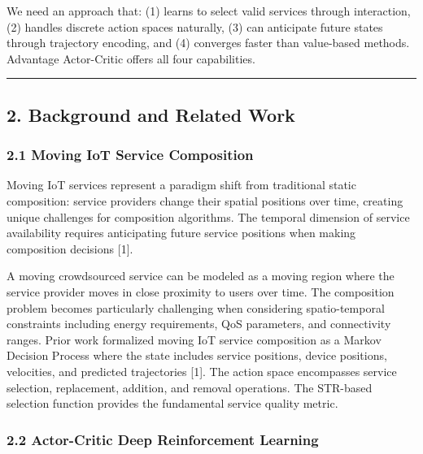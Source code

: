 \documentclass[
  10pt,
  twocolumn,
]{article}
\begin{document}
We need an approach that: (1) learns to select valid services through
interaction, (2) handles discrete action spaces naturally, (3) can
anticipate future states through trajectory encoding, and (4) converges
faster than value-based methods. Advantage Actor-Critic offers all four
capabilities.

\begin{center}\rule{0.5\linewidth}{0.5pt}\end{center}

\hypertarget{background-and-related-work}{%
	\subsection{2. Background and Related
		Work}\label{background-and-related-work}}

\hypertarget{moving-iot-service-composition}{%
	\subsubsection{2.1 Moving IoT Service
		Composition}\label{moving-iot-service-composition}}

Moving IoT services represent a paradigm shift from traditional static
composition: service providers change their spatial positions over time,
creating unique challenges for composition algorithms. The temporal
dimension of service availability requires anticipating future service
positions when making composition decisions {[}1{]}.

A moving crowdsourced service can be modeled as a moving region where
the service provider moves in close proximity to users over time. The
composition problem becomes particularly challenging when considering
spatio-temporal constraints including energy requirements, QoS
parameters, and connectivity ranges. Prior work formalized moving IoT
service composition as a Markov Decision Process where the state
includes service positions, device positions, velocities, and predicted
trajectories {[}1{]}. The action space encompasses service selection,
replacement, addition, and removal operations. The STR-based selection
function provides the fundamental service quality metric.

\hypertarget{actor-critic-deep-reinforcement-learning}{%
	\subsubsection{2.2 Actor-Critic Deep Reinforcement
		Learning}\label{actor-critic-deep-reinforcement-learning}}
\end{document}
